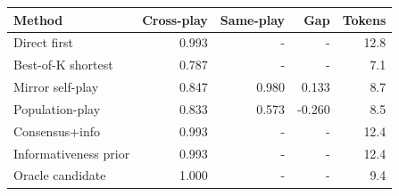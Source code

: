 \begin{tabular}{lrrrr}
\toprule
Method & Cross-play & Same-play & Gap & Tokens \\
\midrule
Direct first & 0.993 & - & - & 12.8 \\
Best-of-K shortest & 0.787 & - & - & 7.1 \\
Mirror self-play & 0.847 & 0.980 & 0.133 & 8.7 \\
Population-play & 0.833 & 0.573 & -0.260 & 8.5 \\
Consensus+info & 0.993 & - & - & 12.4 \\
Informativeness prior & 0.993 & - & - & 12.4 \\
Oracle candidate & 1.000 & - & - & 9.4 \\
\bottomrule
\end{tabular}
